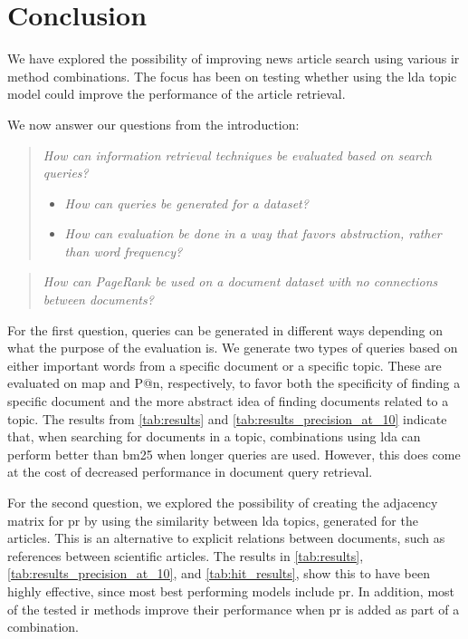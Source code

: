 \section{Conclusion}\label{sec:conclusion}
We have explored the possibility of improving news article search using various \gls{ir} method combinations.
The focus has been on testing whether using the \gls{lda} topic model could improve the performance of the article retrieval.

We now answer our questions from the introduction:
\begin{quote}
	\emph{How can information retrieval techniques be evaluated based on search queries?}
	\begin{itemize}
		\item \emph{How can queries be generated for a dataset?}
		\item \emph{How can evaluation be done in a way that favors abstraction, rather than word frequency?}
	\end{itemize}
\end{quote}
\vspace{0.1 cm}

\begin{quote}
	\emph{How can PageRank be used on a document dataset with no connections between documents?}
\end{quote}

For the first question, queries can be generated in different ways depending on what the purpose of the evaluation is.
We generate two types of queries based on either important words from a specific document or a specific topic.
These are evaluated on \acrlong{map} and P@n, respectively, to favor both the specificity of finding a specific document and the more abstract idea of finding documents related to a topic.
The results from \autoref{tab:results} and \autoref{tab:results_precision_at_10} indicate that, when searching for documents in a topic, combinations using \gls{lda} can perform better than \gls{bm25} when longer queries are used.
However, this does come at the cost of decreased performance in document query retrieval.

For the second question, we explored the possibility of creating the adjacency matrix for \gls{pr} by using the similarity between \gls{lda} topics, generated for the articles.
This is an alternative to explicit relations between documents, such as references between scientific articles.
The results in \autoref{tab:results}, \autoref{tab:results_precision_at_10}, and \autoref{tab:hit_results}, show this to have been highly effective, since most best performing models include \gls{pr}.
In addition, most of the tested \gls{ir} methods improve their performance when \gls{pr} is added as part of a combination.
